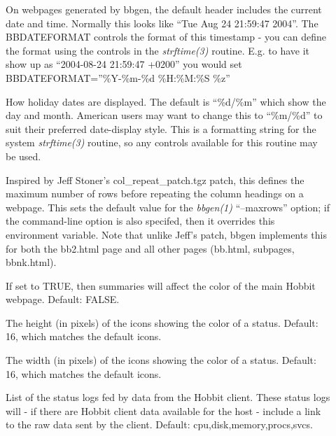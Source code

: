 \begin{description}
 

\item[] On webpages generated by bbgen, the
  default header includes the current date and time. Normally this
  looks like ``Tue Aug 24 21:59:47 2004''. The BBDATEFORMAT controls
  the format of this timestamp - you can define the format using the
  controls in the \emph{strftime(3)} routine. E.g. to have it show up
  as ``2004-08-24 21:59:47 +0200'' you would set
  BBDATEFORMAT=''\%Y-\%m-\%d \%H:\%M:\%S \%z'' 


 

\item[] How holiday dates are displayed. The
  default is ``\%d/\%m'' which show the day and month. American users
  may want to change this to ``\%m/\%d'' to suit their preferred
  date-display style. This is a formatting string for the system
  \emph{strftime(3)} routine, so any controls available for this
  routine may be used. 


 

\item[] Inspired by Jeff Stoner's
  col\_repeat\_patch.tgz patch, this defines the maximum number of
  rows before repeating the column headings on a webpage. This sets
  the default value for the \emph{bbgen(1)} ``--maxrows'' option; if
  the command-line option is also specifed, then it overrides this
  environment variable. Note that unlike Jeff's patch, bbgen
  implements this for both the bb2.html page and all other pages
  (bb.html, subpages, bbnk.html). 


 

\item[] If set to TRUE, then summaries will
  affect the color of the main Hobbit webpage. Default: FALSE. 


 

\item[] The height (in pixels) of the icons showing
  the color of a status. Default: 16, which matches the default
  icons. 


 

\item[] The width (in pixels) of the icons showing the
  color of a status. Default: 16, which matches the default icons. 


 

\item[] List of the status logs fed by data from the
  Hobbit client. These status logs will - if there are Hobbit client
  data available for the host - include a link to the raw data sent by
  the client. Default: cpu,disk,memory,procs,svcs. 



\end{description}
